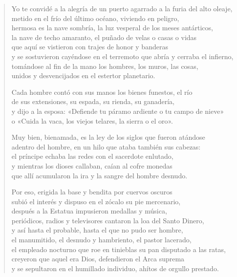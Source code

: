 \documentclass[12pt]{article}
\begin{document}
\begin{verse}
Yo te convidé a la alegría de un puerto agarrado a la furia del alto oleaje,\\
metido en el frío del último océano, viviendo en peligro,\\
hermosa es la nave sombría, la luz vesperal de los meses antárticos,\\
la nave de techo amaranto, el puñado de velas o casas o vidas\\
que aquí se vistieron con trajes de honor y banderas\\
y se sostuvieron cayéndose en el terremoto que abría y cerraba el infierno,\\
tomándose al fin de la mano los hombres, los muros, las cosas,\\
unidos y desvencijados en el estertor planetario.  

Cada hombre contó con sus manos los bienes funestos, el río\\
de sus extensiones, su espada, su rienda, su ganadería,\\
y dijo a la esposa: «Defiende tu páramo ardiente o tu campo de nieve»\\
o «Cuida la vaca, los viejos telares, la sierra o el oro».  

Muy bien, bienamada, es la ley de los siglos que fueron atándose\\
adentro del hombre, en un hilo que ataba también sus cabezas:\\
el príncipe echaba las redes con el sacerdote enlutado,\\
y mientras los dioses callaban, caían al cofre monedas\\
que allí acumularon la ira y la sangre del hombre desnudo.  

Por eso, erigida la base y bendita por cuervos oscuros\\
subió el interés y dispuso en el zócalo su pie mercenario,\\
después a la Estatua impusieron medallas y música,\\
periódicos, radios y televisores cantaron la loa del Santo Dinero,\\
y así hasta el probable, hasta el que no pudo ser hombre,\\
el manumitido, el desnudo y hambriento, el pastor lacerado,\\
el empleado nocturno que roe en tinieblas su pan disputado a las ratas,\\
creyeron que aquel era Dios, defendieron el Arca suprema\\
y se sepultaron en el humillado individuo, ahítos de orgullo prestado.  

\end{verse}
\end{document}
